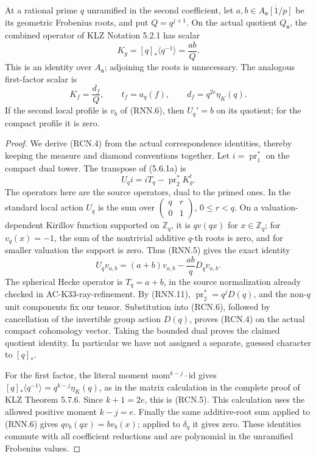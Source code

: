 \begin{lemma}
\label{AC-K33-ray-Hecke}
At a rational prime \(q\) unramified in the second coefficient,
let \(a,b\in\overline{A_{\mathfrak n}[1/p]}\) be its geometric
Frobenius roots, and put \(Q=q^{j+1}\).
On the actual quotient \(Q_{\mathfrak n}\), the combined
operator of KLZ Notation 5.2.1 has scalar
\[
 K_g=[q]_*\langle q^{-1}\rangle=\frac{ab}{Q}.
 \tag{RCN.4}
\]
This is an identity over \(A_{\mathfrak n}\); adjoining the
roots is unnecessary.  The analogous first-factor scalar is
\[
 K_f=\frac{d_f}{Q},\qquad
 t_f=a_q(f),\qquad d_f=q^{2e}\eta_K(q).
 \tag{RCN.5}
\]
If the second local profile is \(v_b\) of (RNN.6), then
\(U_q'=b\) on its quotient; for the compact profile it is zero.
\end{lemma}
\begin{proof}
We derive (RCN.4) from the actual correspondence identities,
thereby keeping the measure and diamond conventions together.
Let \(i=\operatorname{pr}_1^*\) on the compact dual tower.
The transpose of (5.6.1a) is
\[
 U_q i=iT_q-\operatorname{pr}_2^*K_g^t .
 \tag{RCN.6}
\]
The operators here are the source operators, dual to the
primed ones.  In the standard local action \(U_q\) is
the sum over
\(\left(\begin{smallmatrix}q&r\\0&1\end{smallmatrix}\right)\),
\(0\leq r<q\).  On a valuation-dependent Kirillov function
supported on \(\mathbb Z_q\), it is \(qv(qx)\) for
\(x\in\mathbb Z_q\); for \(v_q(x)=-1\), the sum of the
nontrivial additive \(q\)-th roots is zero, and for smaller
valuation the support is zero.
Thus (RNN.5) gives the exact identity
\[
 U_q v_{a,b}=(a+b)v_{a,b}-\frac{ab}{q}D_qv_{a,b}.
 \tag{RCN.7}
\]
The spherical Hecke operator is \(T_q=a+b\), in the source
normalization already checked in AC-K33-ray-refinement.
By (RNN.11), \(\operatorname{pr}_2^*=q^jD(q)\), and the
non-\(q\) unit components fix our tensor.
Substitution into (RCN.6), followed by cancellation of the
invertible group action \(D(q)\), proves (RCN.4) on the actual
compact cohomology vector.  Taking the bounded dual proves
the claimed quotient identity.
In particular we have not assigned a separate, guessed
character to \([q]_*\).

For the first factor, the literal moment
\(\mathrm{mom}^{k-j}\cdot\mathrm{id}\) gives
\([q]_*\langle q^{-1}\rangle=q^{k-j}\eta_K(q)\),
as in the matrix calculation in the complete proof of
KLZ Theorem 5.7.6.  Since \(k+1=2e\), this is (RCN.5).
This calculation uses the allowed positive moment \(k-j=e\).
Finally the same additive-root sum applied to (RNN.6)
gives \(qv_b(qx)=b v_b(x)\); applied to
\(\delta_q\) it gives zero.  These identities commute with
all coefficient reductions and are polynomial in the
unramified Frobenius values.
\end{proof}

